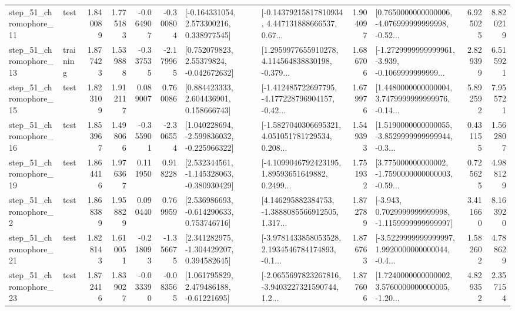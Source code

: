 \begin{tabular}{llrrrrllrlrr}
   step\_51\_chromophore\_11 &      test &      1.840089 &    1.775183 &     -0.064907 & -0.300804 &    [-0.164331054, 2.573300216, 0.338977545] &  [-0.14379215817810934, 4.447131888666537, 0.67... &       1.904097 &  [0.7650000000000006, -4.076999999999998, -0.52... &            6.925025 &          8.820219 \\
   step\_51\_chromophore\_13 &  training &      1.877423 &    1.539888 &     -0.337535 & -2.179965 &     [0.752079823, 2.55379824, -0.042672632] &  [1.2959977655910278, 4.114564838830198, -0.379... &       1.686706 &  [-1.2729999999999961, -3.939, -0.1069999999999... &            2.829399 &          6.515921 \\
   step\_51\_chromophore\_15 &      test &      1.823109 &    1.912117 &      0.089007 &  0.760086 &     [0.884423333, 2.604436901, 0.158666743] &  [-1.412485722697795, -4.177228796904157, -0.42... &       1.679976 &  [1.4480000000000004, 3.7479999999999976, -0.14... &            5.892592 &          7.955721 \\
   step\_51\_chromophore\_16 &      test &      1.853967 &    1.498066 &     -0.355901 & -2.306554 &   [1.040228694, -2.599836032, -0.225966322] &  [-1.5827040306695321, 4.051051781729534, 0.208... &       1.549393 &  [1.5190000000000055, -3.8529999999999944, -0.3... &            0.431155 &          1.562807 \\
   step\_51\_chromophore\_19 &      test &      1.864416 &    1.976367 &      0.111950 &  0.918228 &   [2.532344561, -1.145328063, -0.380930429] &  [-4.1099046792423195, 1.89593651649882, 0.2499... &       1.751932 &  [3.775000000000002, -1.7590000000000003, -0.59... &            0.725625 &          4.988129 \\
    step\_51\_chromophore\_2 &      test &      1.868389 &    1.958829 &      0.090440 &  0.769959 &    [2.536986693, -0.614290633, 0.753746716] &  [4.146295882384753, -1.3888085566912505, 1.317... &       1.872789 &  [-3.943, 0.7029999999999998, -1.1159999999999997] &            3.411660 &          8.163920 \\
   step\_51\_chromophore\_21 &      test &      1.828143 &    1.610051 &     -0.218093 & -1.356675 &    [2.341282975, -1.304429207, 0.394582645] &  [-3.9781433858053528, 2.1934546784174893, -0.1... &       1.876763 &  [-3.5229999999999997, 1.9920000000000044, -0.4... &            1.582602 &          4.788629 \\
   step\_51\_chromophore\_23 &      test &      1.872416 &    1.839027 &     -0.033390 & -0.083565 &     [1.061795829, 2.479486188, -0.61221695] &  [-2.0655697823267816, -3.9403227321590744, 1.2... &       1.877606 &  [1.7240000000000002, 3.5760000000000005, -1.20... &            4.829352 &          2.357154 \\

\end{tabular}
